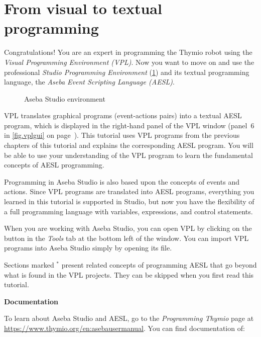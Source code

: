 \part{From visual to textual programming}

\label{ch.next}


Congratulations! You are an expert in programming the Thymio robot using
the \textit{Visual Programming Environment (VPL)}. Now you want to move
on and use the professional \textit{Studio Programming Environment}
(\cref{fig.studio}) and its textual programming language, the
\textit{Aseba Event Scripting Language (AESL)}.

\begin{figure}[hbt]
\begin{center}
\caption{Aseba Studio environment}\label{fig.studio}
\end{center}
\end{figure}

VPL translates graphical programs (event-actions pairs) into a textual
AESL program, which is displayed in the right-hand panel of the VPL
window (panel~6 in \cref{fig.vplgui} on page~\pageref{fig.vplgui}). This tutorial uses VPL programs
from the previous chapters of this tutorial and explains the
corresponding AESL program. You will be able to use your understanding
of the VPL program to learn the fundamental concepts of AESL
programming.

Programming in Aseba Studio is also based upon the concepts of events
and actions. Since VPL programs are translated into AESL programs,
everything you learned in this tutorial is supported in Studio, but now
you have the flexibility of a full programming language with variables,
expressions, and control statements.

When you are working with Aseba Studio, you can open VPL by clicking on
the button  in the \emph{Tools} tab at the bottom left of
the window. You can import VPL programs into Aseba Studio simply by
opening its file.

Sections marked $^*$ present related concepts of programming AESL that
go beyond what is found in the VPL projects. They can be skipped when
you first read this tutorial.

\newpage

\textbf{\large Documentation}

To learn about Aseba Studio and AESL, go to the \emph{Programming
Thymio} page at\\
\href{https://www.thymio.org/en:asebausermanual}{https://www.thymio.org/en:asebausermanual}.
You can find documentation of:

